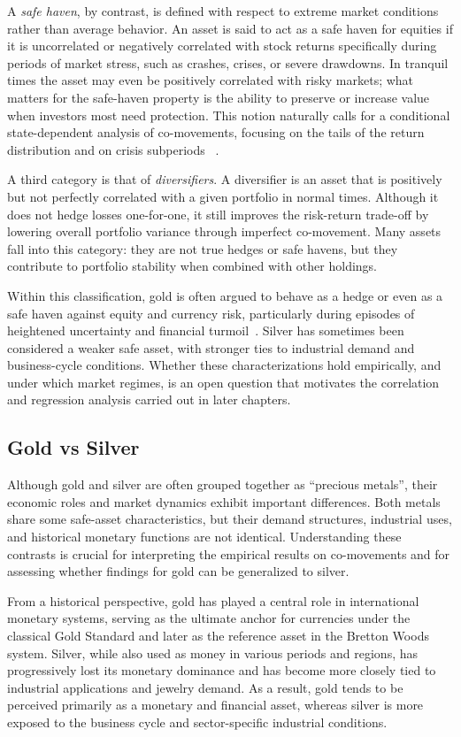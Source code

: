 A \emph{safe haven}, by contrast, is defined with respect to extreme market conditions
rather than average behavior. An asset is said to act as a safe haven for equities if it
is uncorrelated or negatively correlated with stock returns specifically during periods of
market stress, such as crashes, crises, or severe drawdowns. In tranquil times the
asset may even be positively correlated with risky markets; what matters for the safe-haven
property is the ability to preserve or increase value when investors most need
protection. This notion naturally calls for a conditional state-dependent analysis of
co-movements, focusing on the tails of the return distribution and on crisis subperiods
~\cite{BaurLucey2010}.

A third category is that of \emph{diversifiers}. A diversifier is an asset that is
positively but not perfectly correlated with a given portfolio in normal times. Although
it does not hedge losses one-for-one, it still improves the risk-return trade-off by
lowering overall portfolio variance through imperfect co-movement. Many assets fall into
this category: they are not true hedges or safe havens, but they contribute to portfolio
stability when combined with other holdings.

Within this classification, gold is often argued to behave as a hedge or even as a safe
haven against equity and currency risk, particularly during episodes of heightened
uncertainty and financial turmoil~\cite{BaurLucey2010,ErbHarvey2013}. Silver has sometimes
been considered a weaker safe asset, with stronger ties to industrial demand and
business-cycle conditions. Whether these characterizations hold empirically, and under
which market regimes, is an open question that motivates the correlation and regression
analysis carried out in later chapters.
\subsection{Gold vs Silver}

Although gold and silver are often grouped together as ``precious metals'', their economic
roles and market dynamics exhibit important differences. Both metals share some safe-asset
characteristics, but their demand structures, industrial uses, and historical monetary
functions are not identical. Understanding these contrasts is crucial for interpreting the
empirical results on co-movements and for assessing whether findings for gold can be
generalized to silver.

From a historical perspective, gold has played a central role in international monetary
systems, serving as the ultimate anchor for currencies under the classical Gold Standard
and later as the reference asset in the Bretton Woods system. Silver, while also used as
money in various periods and regions, has progressively lost its monetary dominance and
has become more closely tied to industrial applications and jewelry demand. As a result,
gold tends to be perceived primarily as a monetary and financial asset, whereas silver is
more exposed to the business cycle and sector-specific industrial conditions.

